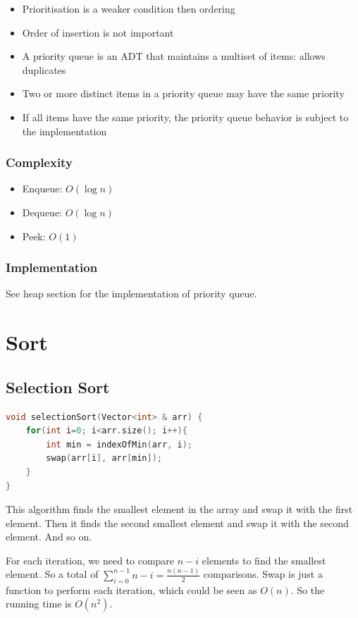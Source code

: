 \documentclass[letterpaper,12pt]{article}
\begin{document}
\begin{itemize}
    \item Prioritisation is a weaker condition then ordering
    \item Order of insertion is not important
    \item A priority queue is an ADT that maintains a multiset of items: allows duplicates
    \item Two or more distinct items in a priority queue may have the same priority
    \item If all items have the same priority, the priority queue behavior is subject to the implementation
\end{itemize}
\subsubsection{Complexity}
\begin{itemize}
    \item Enqueue: $O(\log n)$
    \item Dequeue: $O(\log n)$
    \item Peek: $O(1)$
\end{itemize}
\subsubsection{Implementation}
See heap section for the implementation of priority queue.
\section{Sort}
\subsection{Selection Sort}
\begin{lstlisting}[language=C++]
void selectionSort(Vector<int> & arr) {
    for(int i=0; i<arr.size(); i++){
        int min = indexOfMin(arr, i);
        swap(arr[i], arr[min]);
    }
}
\end{lstlisting}
This algorithm finds the smallest element in the array and swap it with the first element. Then it finds the second smallest element and swap it with the second element. And so on.

For each iteration, we need to compare $n-i$ elements to find the smallest element. So a total of $\sum_{i=0}^{n-1}n-i=\frac{n(n-1)}{2}$ comparisons. Swap is just a function to perform each iteration, which could be seen as $O(n)$. So the running time is $O(n^2)$.
\end{document}
